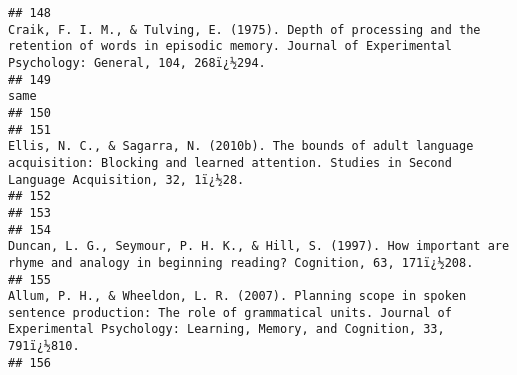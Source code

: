 \documentclass[
  english,
  man]{apa6}
\begin{document}
\begin{verbatim}
## 148                                                                                                                                              Craik, F. I. M., & Tulving, E. (1975). Depth of processing and the retention of words in episodic memory. Journal of Experimental Psychology: General, 104, 268ï¿½294.
## 149                                                                                                                                                                                                                                                                                                                same
## 150                                                                                                                                                                                                                                                                                                                    
## 151                                                                                                                                                  Ellis, N. C., & Sagarra, N. (2010b). The bounds of adult language acquisition: Blocking and learned attention. Studies in Second Language Acquisition, 32, 1ï¿½28.
## 152                                                                                                                                                                                                                                                                                                                    
## 153                                                                                                                                                                                                                                                                                                                    
## 154                                                                                                                                                                            Duncan, L. G., Seymour, P. H. K., & Hill, S. (1997). How important are rhyme and analogy in beginning reading? Cognition, 63, 171ï¿½208.
## 155                                                                                                            Allum, P. H., & Wheeldon, L. R. (2007). Planning scope in spoken sentence production: The role of grammatical units. Journal of Experimental Psychology: Learning, Memory, and Cognition, 33, 791ï¿½810.
## 156                                                                                                                                                                                                                                                                                                                    

\end{verbatim}
\end{document}
